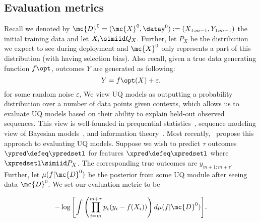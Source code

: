 \subsection{Evaluation metrics}
\label{sec:UQ_eval_metrics}

 Recall we denoted by $ \mc{D}^{0} = (\mc{X}^{0}, \datay^{0}) := (X_{1:m-1},Y_{1:m-1})$ the initial training data and let $X_i \simiid Q_X$. Further, let $P_X$ be the distribution we expect to see during deployment and  $\mc{X}^{0} $ only represents a part of this distribution (with having selection bias). 
 Also recall, given a true data generating function  $f\opt$, outcomes $Y$ are generated as following:
\begin{equation*}
    Y = f\opt(X) + \varepsilon.
\end{equation*}
for some random noise $\varepsilon$,
We view UQ models as outputting a probability distribution over a number of data points given contexts, which allows us to evaluate UQ models based on their ability to explain held-out observed sequences. 
This view is well-founded in  prequential statistics~\citep{Roberts65,Dawid84}, sequence modeling view of Bayesian models~\citep{FortiniPe23}, and information theory~\citep{BarronRiYu98}.
Most recently,~\citet{OsbandWeAsSeDwLuVa22} propose this approach to evaluating UQ models.
Suppose we wish to predict $\tau$ outcomes 
$\ypred \defeq \ypredsetl$ for features $\xpred \defeq \xpredsetl$ where $\xpredsetl \simiid P_X$. The corresponding true outcomes are $y_{m+1:m+\tau}$.  Further, let $\mu(f|\mc{D}^0)$ be the posterior from some UQ module after seeing data $\mc{D}^0$. We  set our evaluation metric to be

\begin{align}
- \log {\left[\int \left(\prod_{i=m}^{m+\tau} p_\epsilon (y_i -f(X_i))\right) d\mu(f|\mc{D}^0) \right]}.
\label{joint_log_loss}
\end{align}




